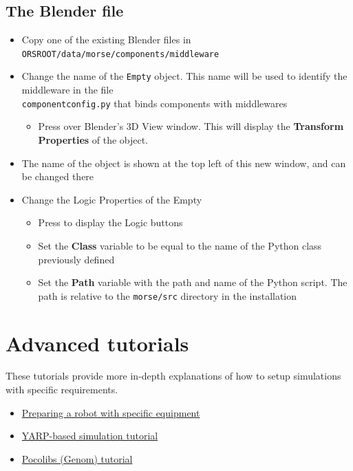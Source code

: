 \documentclass[twoside,a4paper,10pt]{report}
\newcommand{\key}[1]{\fcolorbox{Dark}{Light}{\textbf{#1}}}
\newcommand{\dokutitlelevelone}[1]{\chapter{#1}}
\newcommand{\dokutitleleveltwo}[1]{\section{#1}}
\newcommand{\dokubold}[1]{\textbf{#1}}
\newcommand{\dokumonospace}[1]{\texttt{#1}}
\newcommand{\dokuitem}{\item}
\begin{document}
\dokutitleleveltwo{The Blender file}
\label{a22b5e3241d0ad2ab4f289b4afb21de7}%

\begin{itemize}
\dokuitem  Copy one of the existing Blender files in \dokumonospace{{\textdollar}ORS{\textunderscore}ROOT/data/morse/components/middleware}
\end{itemize}

\begin{itemize}
\dokuitem  Change the name of the \dokumonospace{Empty} object. This name will be used to identify the middleware in the file\\ \dokumonospace{component{\textunderscore}config.py} that binds components with middlewares
\begin{itemize}
\dokuitem  Press \key{N} over Blender's 3D View window. This will display the \dokubold{Transform Properties} of the object.
\end{itemize}

\dokuitem  The name of the object is shown at the top left of this new window, and can be changed there
\end{itemize}

\begin{itemize}
\dokuitem  Change the Logic Properties of the Empty
\begin{itemize}
\dokuitem  Press \key{F4} to display the Logic buttons
\dokuitem  Set the \dokubold{Class} variable to be equal to the name of the Python class previously defined
\dokuitem  Set the \dokubold{Path} variable with the path and name of the Python script. The path is relative to the \dokumonospace{morse/src} directory in the installation
\end{itemize}

\end{itemize}
\dokutitlelevelone{Advanced tutorials}
\label{1db3103f04a8f50e1168ef3c23748f71}%
\label{1db3103f04a8f50e1168ef3c23748f71}%

These tutorials provide more in-depth explanations of how to setup simulations with specific requirements.



\begin{itemize}
\dokuitem  \hyperref[feb94730bf2c8bc6803a472bb56691ae]{ Preparing a robot with specific equipment}
\dokuitem  \hyperref[1dd029a60f7f3dd1deaf993ce4538edf]{ YARP-based simulation tutorial}
\dokuitem  \hyperref[5c7d3aeca93d2be4626b023df992dc1d]{ Pocolibs (Genom) tutorial}
\end{itemize}
\end{document}

